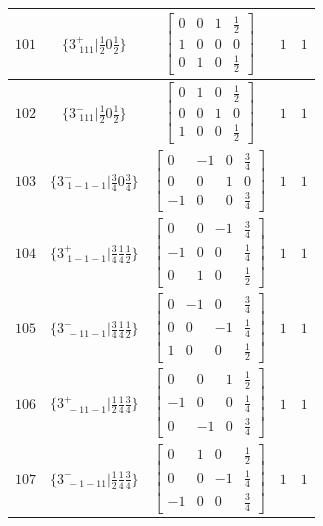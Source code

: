 \documentclass[fleqn,8pt]{jsarticle}
\begin{document}
\begin{longtable}{ccccc}
$ 101 $ & $ \{3^{+}_{\,\,111}|\frac{1}{2} 0 \frac{1}{2}\} $ & $ \begin{bmatrix} 0 & 0 & 1 & \frac{1}{2} \\ 1 & 0 & 0 & 0 \\ 0 & 1 & 0 & \frac{1}{2} \end{bmatrix} $ & $ 1 $ & $ 1 $ \\ \hline
$ 102 $ & $ \{3^{-}_{\,\,111}|\frac{1}{2} 0 \frac{1}{2}\} $ & $ \begin{bmatrix} 0 & 1 & 0 & \frac{1}{2} \\ 0 & 0 & 1 & 0 \\ 1 & 0 & 0 & \frac{1}{2} \end{bmatrix} $ & $ 1 $ & $ 1 $ \\ \hline
$ 103 $ & $ \{3^{-}_{\,\,1-1-1}|\frac{3}{4} 0 \frac{3}{4}\} $ & $ \begin{bmatrix} 0 & -1 & 0 & \frac{3}{4} \\ 0 & 0 & 1 & 0 \\ -1 & 0 & 0 & \frac{3}{4} \end{bmatrix} $ & $ 1 $ & $ 1 $ \\ \hline
$ 104 $ & $ \{3^{+}_{\,\,1-1-1}|\frac{3}{4} \frac{1}{4} \frac{1}{2}\} $ & $ \begin{bmatrix} 0 & 0 & -1 & \frac{3}{4} \\ -1 & 0 & 0 & \frac{1}{4} \\ 0 & 1 & 0 & \frac{1}{2} \end{bmatrix} $ & $ 1 $ & $ 1 $ \\ \hline
$ 105 $ & $ \{3^{-}_{\,\,-11-1}|\frac{3}{4} \frac{1}{4} \frac{1}{2}\} $ & $ \begin{bmatrix} 0 & -1 & 0 & \frac{3}{4} \\ 0 & 0 & -1 & \frac{1}{4} \\ 1 & 0 & 0 & \frac{1}{2} \end{bmatrix} $ & $ 1 $ & $ 1 $ \\ \hline
$ 106 $ & $ \{3^{+}_{\,\,-11-1}|\frac{1}{2} \frac{1}{4} \frac{3}{4}\} $ & $ \begin{bmatrix} 0 & 0 & 1 & \frac{1}{2} \\ -1 & 0 & 0 & \frac{1}{4} \\ 0 & -1 & 0 & \frac{3}{4} \end{bmatrix} $ & $ 1 $ & $ 1 $ \\ \hline
$ 107 $ & $ \{3^{-}_{\,\,-1-11}|\frac{1}{2} \frac{1}{4} \frac{3}{4}\} $ & $ \begin{bmatrix} 0 & 1 & 0 & \frac{1}{2} \\ 0 & 0 & -1 & \frac{1}{4} \\ -1 & 0 & 0 & \frac{3}{4} \end{bmatrix} $ & $ 1 $ & $ 1 $ \\ \hline

\end{longtable}
\end{document}
